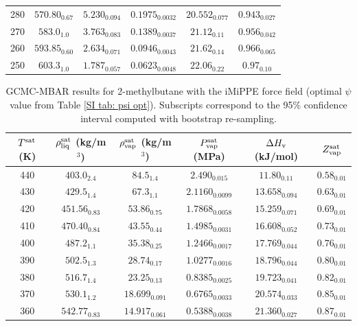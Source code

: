 \documentclass[journal=jctc,manuscript=article]{achemso}
\begin{document}
\begin{table}[htb!]
\begin{center}
\begin{tabular}{|c|c|c|c|c|c|}
			280 & $570.80_{0.67}$ & $5.230_{0.094}$ & $0.1975_{0.0032}$ & $20.552_{0.077}$ & $0.943_{0.027}$ \\
			270 & $583.0_{1.0}$ & $3.763_{0.083}$ & $0.1389_{0.0037}$ & $21.12_{0.11}$ & $0.956_{0.042}$ \\
			260 & $593.85_{0.60}$ & $2.634_{0.071}$ & $0.0946_{0.0043}$ & $21.62_{0.14}$ & $0.966_{0.065}$ \\
			250 & $603.3_{1.0}$ & $1.787_{0.057}$ & $0.0623_{0.0048}$ & $22.06_{0.22}$ & $0.97_{0.10}$ \\
			\hline
		\end{tabular}
	\end{center}
\end{table}

\begin{table}[htb!]
	\caption{GCMC-MBAR results for 2-methylbutane with the iMiPPE force field (optimal $\psi$ value from Table \ref{SI tab: psi opt}). Subscripts correspond to the 95\% confidence interval computed with bootstrap re-sampling.}
	\begin{center}
		\begin{tabular}{|c|c|c|c|c|c|}
			\hline
			$T^{\rm sat}$ (K) & $\rho_{\rm liq}^{\rm sat}$ (kg/m$^3$) & $\rho_{\rm vap}^{\rm sat}$ (kg/m$^3$) & $P_{\rm vap}^{\rm sat}$ (MPa) & $\Delta H_{\rm v}$ (kJ/mol) & $Z_{\rm vap}^{\rm sat}$ \\ \hline
			440 & $403.0_{2.4}$ & $84.5_{1.4}$ & $2.490_{0.015}$ & $11.80_{0.11}$ & $0.58_{0.01}$ \\
			430 & $429.5_{1.4}$ & $67.3_{1.1}$ & $2.1160_{0.0099}$ & $13.658_{0.094}$ & $0.63_{0.01}$ \\
			420 & $451.56_{0.83}$ & $53.86_{0.75}$ & $1.7868_{0.0058}$ & $15.259_{0.071}$ & $0.69_{0.01}$ \\
			410 & $470.40_{0.84}$ & $43.55_{0.44}$ & $1.4985_{0.0031}$ & $16.608_{0.052}$ & $0.73_{0.01}$ \\
			400 & $487.2_{1.1}$ & $35.38_{0.25}$ & $1.2466_{0.0017}$ & $17.769_{0.044}$ & $0.76_{0.01}$ \\
			390 & $502.5_{1.3}$ & $28.74_{0.17}$ & $1.0277_{0.0016}$ & $18.796_{0.044}$ & $0.80_{0.01}$ \\
			380 & $516.7_{1.4}$ & $23.25_{0.13}$ & $0.8385_{0.0025}$ & $19.723_{0.041}$ & $0.82_{0.01}$ \\
			370 & $530.1_{1.2}$ & $18.699_{0.091}$ & $0.6765_{0.0033}$ & $20.574_{0.033}$ & $0.85_{0.01}$ \\
			360 & $542.77_{0.83}$ & $14.917_{0.061}$ & $0.5388_{0.0038}$ & $21.360_{0.027}$ & $0.87_{0.01}$ \\

\end{tabular}
\end{center}
\end{table}
\end{document}
